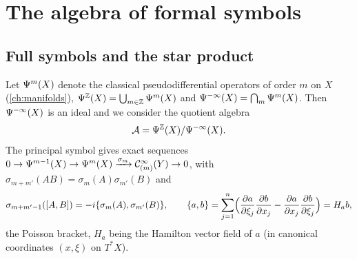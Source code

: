 \section{The algebra of formal symbols}\label{hochschild:sec:symbols}

\subsection{Full symbols and the star product}
Let $\Psi^{m}(X)$ denote the classical pseudodifferential operators of order
$m$ on $X$ (\cref{ch:manifolds}), $\Psi^{\mathbb{Z}}(X)=\bigcup_{m\in\mathbb{Z}}\Psi^{m}(X)$
and $\Psi^{-\infty}(X)=\bigcap_m\Psi^{m}(X)$. Then $\Psi^{-\infty}(X)$ is an
ideal and we consider the quotient algebra
\begin{equation*}
  \mathcal{A}=\Psi^{\mathbb{Z}}(X)/\Psi^{-\infty}(X).
\end{equation*}
The principal symbol gives exact sequences $0\to\Psi^{m-1}(X)\to\Psi^{m}(X)
\xrightarrow{\sigma_m}\mathcal{C}^\infty_{(m)}(Y)\to0$, with
$\sigma_{m+m'}(AB)=\sigma_m(A)\sigma_{m'}(B)$ and
\begin{equation*}
  \sigma_{m+m'-1}([A,B])=-i\{\sigma_m(A),\sigma_{m'}(B)\},\qquad
  \{a,b\}=\sum_{j=1}^n\Bigl(\frac{\partial a}{\partial\xi_j}\frac{\partial b}{\partial x_j}-
  \frac{\partial a}{\partial x_j}\frac{\partial b}{\partial\xi_j}\Bigr)=H_ab,
\end{equation*}
the Poisson bracket, $H_a$ being the Hamilton vector field of $a$ (in
canonical coordinates $(x,\xi)$ on $T^*X$).

